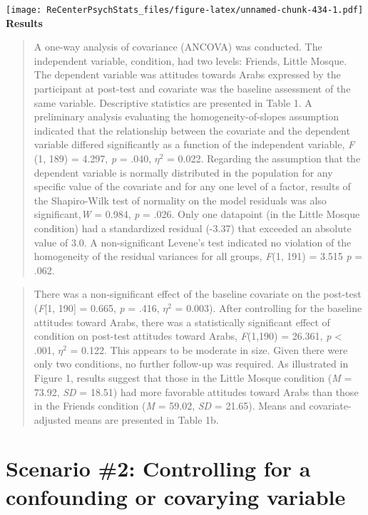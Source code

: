 \documentclass[
  11pt,
]{book}
\begin{document}
\texttt{[image: ReCenterPsychStats\_files/figure-latex/unnamed-chunk-434-1.pdf]}
\textbf{Results}

\begin{quote}
A one-way analysis of covariance (ANCOVA) was conducted. The independent variable, condition, had two levels: Friends, Little Mosque. The dependent variable was attitudes towards Arabs expressed by the participant at post-test and covariate was the baseline assessment of the same variable. Descriptive statistics are presented in Table 1. A preliminary analysis evaluating the homogeneity-of-slopes assumption indicated that the relationship between the covariate and the dependent variable differed significantly as a function of the independent variable, \emph{F} (1, 189) = 4.297, \emph{p} = .040, \(\eta^2\) = 0.022. Regarding the assumption that the dependent variable is normally distributed in the population for any specific value of the covariate and for any one level of a factor, results of the Shapiro-Wilk test of normality on the model residuals was also significant,\emph{W} = 0.984, \emph{p} = .026. Only one datapoint (in the Little Mosque condition) had a standardized residual (-3.37) that exceeded an absolute value of 3.0. A non-significant Levene's test indicated no violation of the homogeneity of the residual variances for all groups, \emph{F}(1, 191) = 3.515 \emph{p} = .062.
\end{quote}

\begin{quote}
There was a non-significant effect of the baseline covariate on the post-test (\emph{F}{[}1, 190{]} = 0.665, \emph{p} = .416, \(\eta^2\) = 0.003). After controlling for the baseline attitudes toward Arabs, there was a statistically significant effect of condition on post-test attitudes toward Arabs, \emph{F}(1,190) = 26.361, \emph{p} \textless{} .001, \(\eta^2\) = 0.122. This appears to be moderate in size. Given there were only two conditions, no further follow-up was required. As illustrated in Figure 1, results suggest that those in the Little Mosque condition (\emph{M} = 73.92, \emph{SD} = 18.51) had more favorable attitudes toward Arabs than those in the Friends condition (\emph{M} = 59.02, \emph{SD} = 21.65). Means and covariate-adjusted means are presented in Table 1b.
\end{quote}

\hypertarget{scenario-2-controlling-for-a-confounding-or-covarying-variable}{%
\section{Scenario \#2: Controlling for a confounding or covarying variable}\label{scenario-2-controlling-for-a-confounding-or-covarying-variable}}
\end{document}
